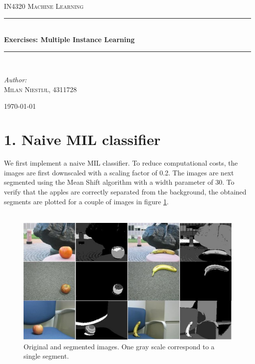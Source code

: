 \documentclass [a4paper] {report}
\begin{document}
	
	\begin{titlepage}
		\begin{center}
			
			\textsc{\LARGE IN4320 Machine Learning}\\[1.25cm]
			
			\rule{\linewidth}{0.5mm}\\[1.0cm]
			{\huge \bfseries Exercises: Multiple Instance Learning }\\[0.6cm]
			\rule{\linewidth}{0.5mm}\\[1.5cm]
			
			\begin{minipage}{0.4\textwidth}
				\begin{flushleft} \large	
					\emph{Author:}\\
					\textsc{Milan Niestijl, 4311728}
				\end{flushleft}
			\end{minipage}
			
			\vfill
			{\large \today}
		\end{center}
	\end{titlepage}
	
	\section*{1. Naive MIL classifier}
	We first implement a naive MIL classifier. To reduce computational costs, the images are first downscaled with a scaling factor of 0.2. The images are next segmented using the Mean Shift algorithm with a width parameter of 30. To verify that the apples are correctly separated from the background, the obtained segments are plotted for a couple of images in figure \ref{segments}.\\\\
	
	\begin{figure}[H]
		\begin{center}
			\includegraphics[scale=0.4]{images/segments.jpg}
			\caption{Original and segmented images. One gray scale correspond to a single segment. }
			\label{segments}
		\end{center}
	\end{figure}
	
\end{document}
